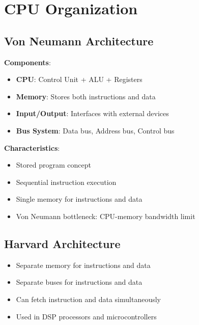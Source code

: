 \documentclass[12pt,a4paper]{report}
\begin{document}
\section{CPU Organization}

\subsection{Von Neumann Architecture}
\begin{concept}
\textbf{Components}:
\begin{itemize}
    \item \textbf{CPU}: Control Unit + ALU + Registers
    \item \textbf{Memory}: Stores both instructions and data
    \item \textbf{Input/Output}: Interfaces with external devices
    \item \textbf{Bus System}: Data bus, Address bus, Control bus
\end{itemize}

\textbf{Characteristics}:
\begin{itemize}
    \item Stored program concept
    \item Sequential instruction execution
    \item Single memory for instructions and data
    \item Von Neumann bottleneck: CPU-memory bandwidth limit
\end{itemize}
\end{concept}

\subsection{Harvard Architecture}
\begin{concept}
\begin{itemize}
    \item Separate memory for instructions and data
    \item Separate buses for instructions and data
    \item Can fetch instruction and data simultaneously
    \item Used in DSP processors and microcontrollers
\end{itemize}
\end{concept}
\end{document}

